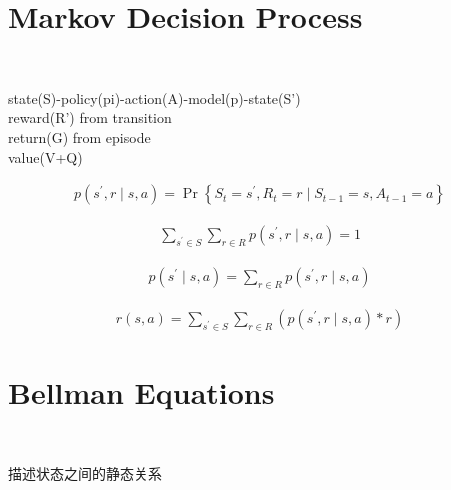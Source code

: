 \documentclass{article}
\begin{document}
\section{Markov Decision Process}


~ \\[6pt]
\begin{CJK}{UTF8}{gbsn}
    state(S)-policy(pi)-action(A)-model(p)-state(S') \\[6pt]
    reward(R') from transition \\[6pt]
    return(G)  from episode \\[6pt]
    value(V+Q) \\[6pt]
\end{CJK}


\begin{align*}
    p \left( s^{\prime}, r \mid s, a \right)
    = \operatorname{Pr} \left\{ S_{t}=s^{\prime}, R_{t}=r \mid 
    S_{t-1}=s, A_{t-1}=a \right\}
\end{align*}


\begin{align*}
    \sum_{s^{\prime} \in S} \sum_{r \in R} 
    p \left( s^{\prime}, r \mid s, a \right) = 1
\end{align*}


\begin{align*}
    p \left( s^{\prime} \mid s, a \right)
    = \sum_{r \in R} p \left( s^{\prime}, r \mid s, a \right)
\end{align*}


\begin{align*}
    r(s, a) = \sum_{s^{\prime} \in S} 
    \sum_{r \in R} 
    \left( p \left( s^{\prime}, r \mid s, a \right) * r \right)
\end{align*}


\newpage
\section{Bellman Equations}


~ \\[6pt]
\begin{CJK}{UTF8}{gbsn}
    描述状态之间的静态关系 \\[6pt]
\end{CJK}
\end{document}
